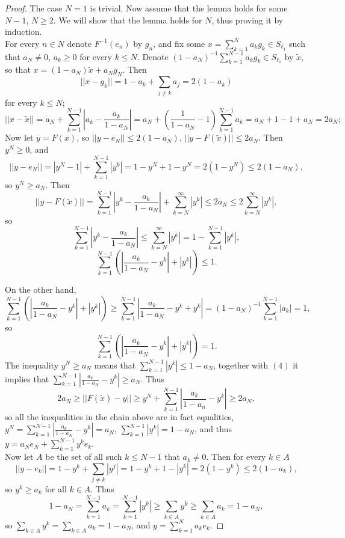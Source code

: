 \documentclass[reqno]{amsart}
\theoremstyle{plain}
\theoremstyle{remark}
\theoremstyle{definition}
\begin{document}
\begin{proof}
     The case $N=1$ is trivial. Now assume that the lemma holds for some $N-1$, $N \geq 2$. We will show that the lemma holds for $N$, thus proving it by induction.\\
     For every $n \in N$ denote $F^{-1}(e_n)$ by $g_n$, and fix some $x=\sum_{k=1}^{N}a_kg_k \in S_{\ell_1}$ such that $a_N\neq0$, $a_k \geq 0$ for every $k \leq N$.
     Denote $(1-a_N)^{-1}\sum_{k=1}^{N-1}a_kg_k \in S_{\ell_1}$ by $\tilde{x}$, so that $x=(1-a_N)\tilde{x}+a_Ng_N$. Then 
     \[||x-g_k||=1-a_k+\sum_{j\neq k}a_j=2(1-a_k)\]
     for every $k \leq N$;
     \[||x-\tilde{x}||=a_N+\sum_{k=1}^{N-1}\left|a_k-\frac{a_k}{1-a_N}\right|=a_N+\left(\frac{1}{1-a_N}-1 \right)\sum_{k=1}^{N-1}a_k=a_N+1-1+a_N=2a_N;\]
     Now let $y=F(x)$, so $||y-e_N||\leq 2(1-a_N)$, $||y-F(\tilde{x})||\leq 2a_N$. Then $y^N\geq 0$, and
     \[||y-e_N||=|y^N-1| +\sum_{k=1}^{N-1}|y^k|=1-y^N+1-y^N=2(1-y^N)\leq 2(1-a_N),\]
     so $y^N \geq a_N$. Then
     \[||y-F(\tilde x)||=\sum_{k=1}^{N-1}\left|y^k-\frac{a_k}{1-a_N}\right|+\sum_{k=N}^\infty|y^k|\leq 2a_N \leq 2\sum_{k=N}^\infty|y^k|,\]
     so
     \[\sum_{k=1}^{N-1}\left|y^k-\frac{a_k}{1-a_N}\right|\leq \sum_{k=N}^\infty|y^k|=1-\sum_{k=1}^{N-1}|y^k|,\]
     \[\sum_{k=1}^{N-1} \left( \left|\frac{a_k}{1-a_N}-y^k\right|+|y^k| \right)\leq 1.\]
     
     On the other hand,
     \[\sum_{k=1}^{N-1} \left( \left|\frac{a_k}{1-a_N}-y^k\right|+|y^k| \right)\geq \sum_{k=1}^{N-1}  \left|\frac{a_k}{1-a_N}-y^k+y^k\right| =(1-a_N)^{-1}\sum_{k=1}^{N-1}|a_k|=1,\]
     so 
     \begin{equation}
        \sum_{k=1}^{N-1} \left( \left|\frac{a_k}{1-a_N}-y^k\right|+|y^k| \right)= 1. 
     \end{equation}
     The inequality $y^N\geq a_N$ means that $\sum_{k=1}^{N-1}|y^k|\leq 1-a_N$, together with $(4)$ it implies that $\sum_{k=1}^{N-1}|\frac{a_k}{1-a_N}-y^k|\geq a_N$. Thus
     \[2a_N\geq ||F(\tilde x)-y||\geq y^N+\sum_{k=1}^{N-1}\left|\frac{a_k}{1-a_n}-y^k\right|\geq 2a_N,\]
     so all the inequalities in the chain above are in fact equalities, $y^N=\sum_{k=1}^{N-1}|\frac{a_k}{1-a_N}-y^k|=a_N$, $\sum_{k=1}^{N-1}|y^k|=1-a_N$, and thus $y=a_Ne_N+\sum_{k=1}^{N-1}y^ke_k$.\\
     Now let $A$ be the set of all such $k\leq N-1$ that $a_k \neq 0$. Then  for every $k \in A$
     \[||y-e_k||=1-y^k+\sum_{j\neq k}|y^j|=1-y^k+1-|y^k|=2(1-y^k)\leq 2(1-a_k),\]
     so $y^k\geq a_k$ for all $k \in A$. Thus
     \[1-a_N=\sum_{k=1}^{N-1}a_k=\sum_{k=1}^{N-1}|y^k|\geq\sum_{k\in A}y^k\geq \sum_{k \in A}a_k=1-a_N,\]
     so $\sum_{k\in A}y^k=\sum_{k\in A}a_k=1-a_N$, and $y=\sum_{k=1}^Na_ke_k$.
    
\end{proof}
\end{document}
